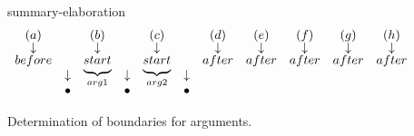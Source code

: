 \begin{figure}[ht]
\centering

summary-elaboration
\[
\begin{array}{*{11}{c}}
(a)& &(b)& &(c)& &(d)&(e)&(f)&(g)&(h)\\[-2pt]
\downarrow& &\downarrow& &\downarrow& &\downarrow&\downarrow&\downarrow&\downarrow&\downarrow\\[-2pt]
before& &\undermat{arg1}{start}& &\undermat{arg2}{start}& &after&after&after&after&after\\
&\downarrow& &\downarrow& &\downarrow& & & & & \\
&\bullet& &\bullet& &\bullet& & & & &
\end{array}
\]

\caption{\label{i:rare-bounds} Determination of boundaries for arguments. }

\end{figure}
